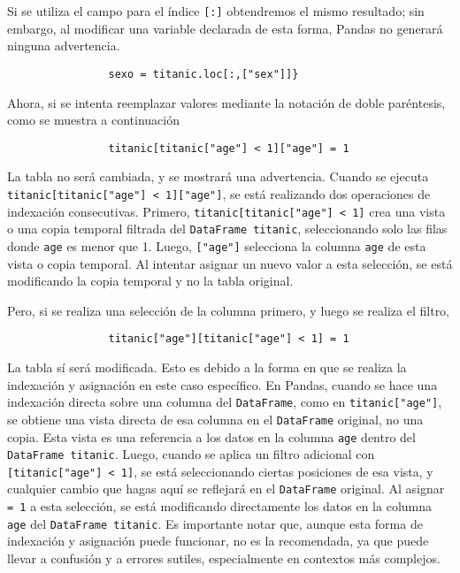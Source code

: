             \noindent Si se utiliza el campo para el índice \texttt{[:]} obtendremos el mismo resultado; sin embargo, al modificar una variable declarada de esta forma, Pandas no generará ninguna advertencia.
            
            \begin{verbatim}
                sexo = titanic.loc[:,["sex"]]}            
            \end{verbatim}
            
            Ahora, si se intenta reemplazar valores mediante la notación de doble paréntesis, como se muestra a continuación
            \begin{verbatim}
                titanic[titanic["age"] < 1]["age"] = 1
            \end{verbatim}
            
            \noindent La tabla no será cambiada, y se mostrará una advertencia. Cuando se ejecuta \texttt{titanic[titanic["age"] < 1]["age"]}, se está realizando dos operaciones de indexación consecutivas. Primero, \texttt{titanic[titanic["age"] < 1]} crea una vista o una copia temporal filtrada del \texttt{DataFrame titanic}, seleccionando solo las filas donde \texttt{age} es menor que 1. Luego, \texttt{["age"]} selecciona la columna \texttt{age} de esta vista o copia temporal. Al intentar asignar un nuevo valor a esta selección, se está modificando la copia temporal y no la tabla original.

            \noindent Pero, si se realiza una selección de la columna primero, y luego se realiza el filtro,
            \begin{verbatim}
                titanic["age"][titanic["age"] < 1] = 1
            \end{verbatim}

            La tabla sí será modificada. Esto es debido a la forma en que se realiza la indexación y asignación en este caso específico. En Pandas, cuando se hace una indexación directa sobre una columna del \texttt{DataFrame}, como en \texttt{titanic["age"]}, se obtiene una vista directa de esa columna en el \texttt{DataFrame} original, no una copia. Esta vista es una referencia a los datos en la columna \texttt{age} dentro del \texttt{DataFrame titanic}. Luego, cuando se aplica un filtro adicional con \texttt{[titanic["age"] < 1]}, se está seleccionando ciertas posiciones de esa vista, y cualquier cambio que hagas aquí se reflejará en el \texttt{DataFrame} original. Al asignar \texttt{= 1} a esta selección, se está modificando directamente los datos en la columna \texttt{age} del \texttt{DataFrame titanic}. Es importante notar que, aunque esta forma de indexación y asignación puede funcionar, no es la recomendada, ya que puede llevar a confusión y a errores sutiles, especialmente en contextos más complejos. \\\


